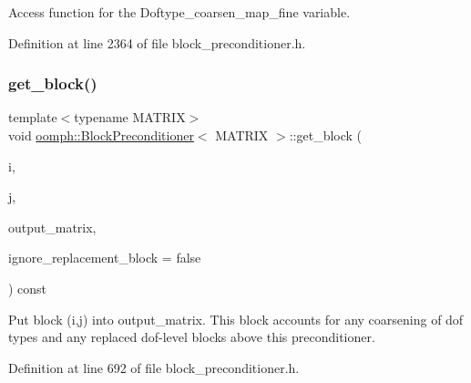Access function for the Doftype\+\_\+coarsen\+\_\+map\+\_\+fine variable. 



Definition at line 2364 of file block\+\_\+preconditioner.\+h.

\mbox{\label{classoomph_1_1BlockPreconditioner_a72b4dbe167da59d9ba12c7eff97d77e6}} 
\subsubsection{\texorpdfstring{get\+\_\+block()}{get\_block()}\hspace{0.1cm}{\footnotesize\ttfamily [1/2]}}
{\footnotesize\ttfamily template$<$typename M\+A\+T\+R\+IX$>$ \\
void \hyperlink{classoomph_1_1BlockPreconditioner}{oomph\+::\+Block\+Preconditioner}$<$ M\+A\+T\+R\+IX $>$\+::get\+\_\+block (\begin{DoxyParamCaption}\item[{const unsigned \&}]{i,  }\item[{const unsigned \&}]{j,  }\item[{M\+A\+T\+R\+IX \&}]{output\+\_\+matrix,  }\item[{const bool \&}]{ignore\+\_\+replacement\+\_\+block = {\ttfamily false} }\end{DoxyParamCaption}) const\hspace{0.3cm}{\ttfamily [inline]}}



Put block (i,j) into output\+\_\+matrix. This block accounts for any coarsening of dof types and any replaced dof-\/level blocks above this preconditioner. 



Definition at line 692 of file block\+\_\+preconditioner.\+h.

\mbox{\label{classoomph_1_1BlockPreconditioner_a4c37f469646c689b5f1e79d0953bd588}} 
